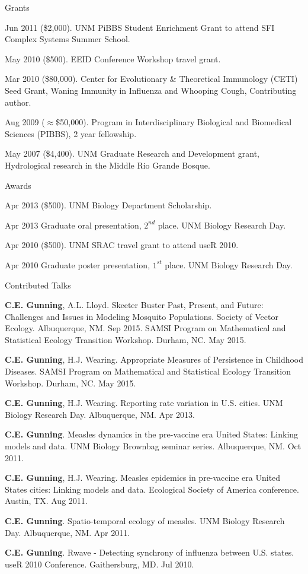 \documentclass{resume} %
\begin{document}
\clearpage
\begin{rSection}{Grants}
\item Jun 2011 (\$2,000). UNM PiBBS Student Enrichment Grant to attend SFI Complex Systems Summer School.
\item May 2010 (\$500). EEID Conference Workshop travel grant.
\item Mar 2010 (\$80,000). Center for Evolutionary \& Theoretical Immunology (CETI) Seed
Grant, Waning Immunity in Influenza and Whooping Cough, Contributing author.
\item Aug 2009 ($\approx$\$50,000). Program in Interdisciplinary Biological and Biomedical
Sciences (PIBBS), 2 year fellowship.
\item May 2007 (\$4,400). UNM Graduate Research and Development grant, Hydrological
research in the Middle Rio Grande Bosque. 
\end{rSection}

\begin{rSection}{Awards}
\item Apr 2013 (\$500). UNM Biology Department Scholarship.
\item Apr 2013 Graduate oral presentation, $2^{nd}$ place. UNM Biology Research Day.
\item Apr 2010 (\$500). UNM SRAC travel grant to attend useR 2010.
\item Apr 2010  Graduate poster presentation, $1^{st}$ place. UNM Biology Research Day.
\end{rSection}

\begin{rSection}{Contributed Talks}
\item {\bf C.E. Gunning}, A.L. Lloyd.  Skeeter Buster Past, Present, and Future: Challenges and Issues in Modeling Mosquito Populations.
Society of Vector Ecology. Albuquerque, NM. Sep 2015.
SAMSI Program on Mathematical and Statistical Ecology Transition Workshop. Durham, NC. May 2015.
\item {\bf C.E. Gunning}, H.J. Wearing.  Appropriate Measures of Persistence in Childhood Diseases.
SAMSI Program on Mathematical and Statistical Ecology Transition Workshop. Durham, NC. May 2015.
\item {\bf C.E. Gunning}, H.J. Wearing.  Reporting rate variation in U.S. cities.
UNM Biology Research Day. Albuquerque, NM. Apr 2013.
\item {\bf C.E. Gunning}.  Measles dynamics in the pre-vaccine era United States: Linking
models and data. UNM Biology Brownbag seminar series. Albuquerque, NM. Oct 2011.
\item {\bf C.E. Gunning}, H.J. Wearing.  Measles epidemics in pre-vaccine era United States cities: Linking models and data. Ecological Society of America conference. Austin, TX. Aug 2011.
\item {\bf C.E. Gunning}.  Spatio-temporal ecology of measles. 
UNM Biology Research Day. Albuquerque, NM. Apr 2011.
\item {\bf C.E. Gunning}. Rwave - Detecting synchrony of influenza between U.S. states.
useR 2010 Conference. Gaithersburg, MD. Jul 2010.
\end{rSection}
\end{document}
